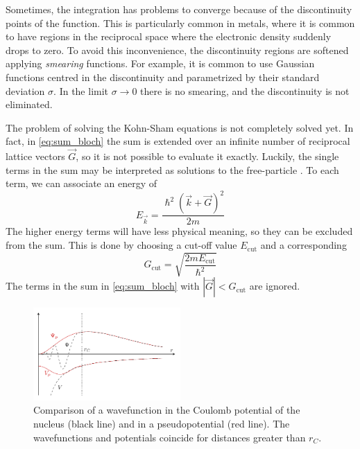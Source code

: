 Sometimes, the integration has problems to converge because of the discontinuity points of the function. This is particularly common in metals, where it is common to have regions in the reciprocal space where the electronic density suddenly drops to zero. To avoid this inconvenience, the discontinuity regions are softened applying \emph{smearing} functions. For example, it is common to use Gaussian functions centred in the discontinuity and parametrized by their standard deviation $\sigma$. In the limit $\sigma \rightarrow 0$ there is no smearing, and the discontinuity is not eliminated.

The problem of solving the Kohn-Sham equations is not completely solved yet. In fact, in \cref{eq:sum_bloch} the sum is extended over an infinite number of reciprocal lattice vectors $\vec{G}$, so it is not possible to evaluate it exactly. Luckily, the single terms in the sum may be interpreted as solutions to the free-particle \sche. To each term, we can associate an energy of
\begin{equation}
    E_\vec{k} = \frac{\hslash^2(\vec{k}+\vec{G})^2}{2m}
\end{equation}
The higher energy terms will have less physical meaning, so they can be excluded from the sum. This is done by choosing a cut-off value $E_\text{cut}$ and a corresponding
\begin{equation}
    G_\text{cut} = \sqrt{\frac{2mE_\text{cut}}{\hbar^2}}
\end{equation}
The terms in the sum in \cref{eq:sum_bloch} with $|\vec{G}| < G_\text{cut}$ are ignored.

\begin{figure}
    \centering
    \includegraphics[width=0.5\textwidth]{figures/pseudopotential/pseudopotential.pdf}
    \caption[Pseudopotentials]{Comparison of a wavefunction in the Coulomb potential of the nucleus (black line) and in a pseudopotential (red line). The wavefunctions and potentials coincide for distances greater than $r_C$.}
    \label{fig:pseudopotential}
\end{figure}

